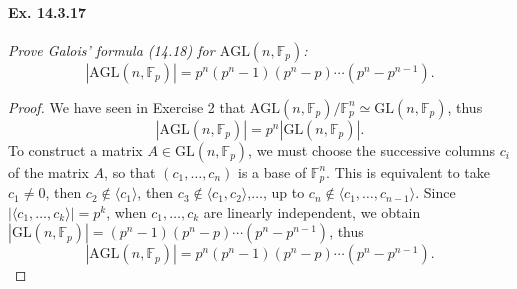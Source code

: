 \documentclass[11pt,a4paper]{article}
\newcommand{\F}{\mathbb{F}}
\begin{document}
 
\paragraph{Ex. 14.3.17}{\it  Prove Galois' formula (14.18) for $\mathrm{AGL}(n,\F_p)$:
$$|\mathrm{AGL}(n,\F_p)| = p^n(p^n-1)(p^n-p)\cdots(p^n - p^{n-1}).$$
 }
 \begin{proof}
We have seen in Exercise 2 that $\mathrm{AGL}(n,\F_p)/ \F_p^n \simeq \mathrm{GL}(n,\F_p)$, thus
 $$|\mathrm{AGL}(n,\F_p)| = p^n |\mathrm{GL}(n,\F_p)|.$$
 To construct a matrix $A \in \mathrm{GL}(n,\F_p)$, we must choose the successive columns $c_i$ of the matrix $A$, so that $(c_1,\ldots,c_n)$ is a base of $\F_p^n$. This is equivalent to take  $c_1 \ne 0$, then $c_2 \not \in \langle c_1 \rangle$, then $c_3 \not \in \langle c_1,c_2 \rangle$,$\ldots$, up to $c_n \not \in \langle c_1,\ldots,c_{n-1} \rangle $. Since $|\langle c_1,\ldots,c_{k} \rangle| = p^k$, when $c_1,\ldots,c_k$ are linearly independent, we obtain $|\mathrm{GL}(n,\F_p)| = (p^n-1)(p^n-p)\cdots(p^n - p^{n-1})$, thus
 $$|\mathrm{AGL}(n,\F_p)| = p^n(p^n-1)(p^n-p)\cdots(p^n - p^{n-1}).$$
 \end{proof}
 
\end{document}
